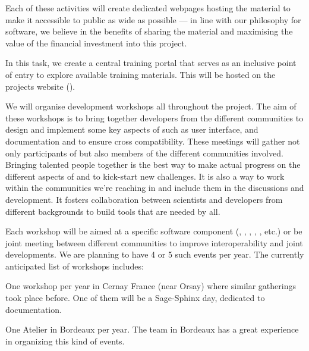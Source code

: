 \begin{workpackage}
\begin{tasklist}
\begin{task}[title=Training and training portal,
id=training-portal,lead=PS,PM=1,wphases={0-48!.1,0-1},issue=25]
Each of these activities will create dedicated webpages hosting the
material to make it accessible to public as wide as possible ---
in line with our philosophy for software, we believe in the benefits of
sharing the material and maximising the value of the financial
investment into this project.

In this task, we create a central \TheProject training portal that
serves as an inclusive point of entry to explore available training
materials. This will be hosted on the projects website ().
\end{task}

\begin{task}[title=Community Building: Development Workshops, lead=PS,PM=24, partners={UB,UK,SR,SA,USH,UG}, id=devel-workshops, wphases=0-48, issue=26]
  We will organise development workshops all throughout the
  project. The aim of these workshops is to bring together developers
  from the different communities to design and implement some key
  aspects of \TheProject such as user interface, and documentation and
  to ensure cross compatibility. These meetings will gather not only
  participants of \TheProject but also members of the different
  communities involved. Bringing talented people together is the best
  way to make actual progress on the different aspects of \TheProject
  and to kick-start new challenges. It is also a way to work within
  the communities we're reaching in and include them in the discussions
  and development. It fosters collaboration between scientists and
  developers from different backgrounds to build tools that are needed
  by all.

  Each workshop will be aimed at a specific software component (\Sage,
  \GAP, \SMC, \IPython, \Singular, etc.) or be joint meeting between
  different communities to improve interoperability and joint
  developments. We are planning to have 4 or 5 such events per
  year. The currently anticipated list of workshops includes:

\begin{compactitem}
\item One \Sage workshop per year in Cernay France (near Orsay) where
  similar gatherings took place before. One of them will be a
  Sage-Sphinx day, dedicated to documentation.

\item One Atelier \Pari in Bordeaux per year. The team in Bordeaux has
  a great experience in organizing this kind of \Pari events.


\end{compactitem}
\end{task}
\end{tasklist}
\end{workpackage}
